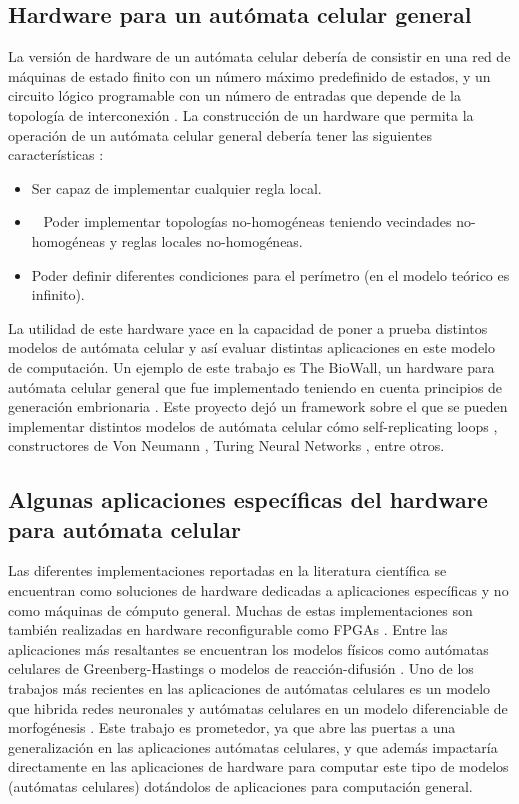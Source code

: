 \documentclass[conference]{IEEEtran}
\begin{document}
\subsection{Hardware para un autómata celular general}
La versión de hardware de un autómata celular debería de consistir en una red de máquinas de estado finito con un número máximo predefinido de estados, y un circuito lógico programable con un número de entradas que depende de la topología de interconexión \cite{poznanovic2006}. La construcción de un hardware que permita la operación de un autómata celular general debería tener las siguientes características \cite{poznanovic2006}: 

\begin{itemize}
\item Ser capaz de implementar cualquier regla local.
\item  Poder implementar topologías no-homogéneas teniendo vecindades no-homogéneas y reglas locales no-homogéneas.
\item Poder definir diferentes condiciones para el perímetro (en el modelo teórico es infinito).
\end{itemize}

La utilidad de este hardware yace en la capacidad de poner a prueba distintos modelos de autómata celular y así evaluar distintas aplicaciones en este modelo de computación. Un ejemplo de este trabajo es The BioWall, un hardware para autómata celular general que fue implementado teniendo en cuenta principios de generación embrionaria \cite{tempesti2002biowall}. Este proyecto dejó un framework sobre el que se pueden implementar distintos modelos de autómata celular cómo self-replicating loops \cite{tempesti2012}, constructores de Von Neumann \cite{chou1998self}, Turing Neural Networks \cite{poznanovic2006}, entre otros.

\subsection{Algunas aplicaciones específicas del hardware para autómata celular}
Las diferentes implementaciones reportadas en la literatura científica se encuentran como soluciones de hardware dedicadas a aplicaciones específicas y no como máquinas de cómputo general. Muchas de estas implementaciones son también realizadas en hardware reconfigurable como FPGAs \cite{poznanovic2006}.
Entre las aplicaciones más resaltantes se encuentran los modelos físicos como autómatas celulares de Greenberg-Hastings \cite{tamayohartman1995} o modelos de reacción-difusión \cite{adamatzky2005reaction}. Uno de los trabajos más recientes en las aplicaciones de autómatas celulares es un modelo que hibrida redes neuronales y autómatas celulares en un modelo diferenciable de morfogénesis \cite{mordvintsev2020growing}. Este trabajo es prometedor, ya que abre las puertas a una generalización en las aplicaciones autómatas celulares, y que además impactaría directamente en las aplicaciones de hardware para computar este tipo de modelos (autómatas celulares) dotándolos de aplicaciones para computación general.
\end{document}
